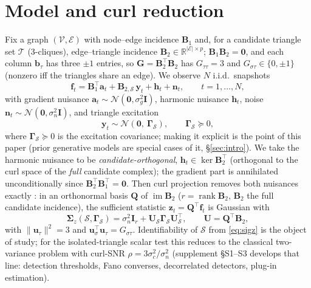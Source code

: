 \documentclass{article}
\DeclareMathOperator{\rank}{rank}
\DeclareMathOperator{\im}{im}
\newcommand{\B}{\bm{B}}
\newcommand{\R}{\mathbb{R}}
\newcommand{\Scal}{\mathcal{S}}
\newcommand{\Tcal}{\mathcal{T}}
\newcommand{\Gam}{\bm{\Gamma}}
\begin{document}
\section{Model and curl reduction}
Fix a graph $(\mathcal V,\mathcal E)$ with node--edge incidence $\B_1$ and,
for a candidate triangle set $\Tcal$ (3-cliques), edge--triangle incidence
$\B_2\in\R^{|\mathcal E|\times p}$; $\B_1\B_2=\bm 0$, and each column
$\bm b_\tau$ has three $\pm1$ entries, so $\bm G=\B_2^{\!\top}\B_2$ has
$G_{\tau\tau}=3$ and $G_{\sigma\tau}\in\{0,\pm1\}$ (nonzero iff the triangles
share an edge). We observe $N$ i.i.d.\ snapshots
\begin{equation}\label{eq:model}
\bm f_t=\B_1^{\!\top}\bm a_t+\B_{2,\Scal}\,\bm y_t+\bm h_t+\bm n_t,\qquad
t=1,\dots,N,
\end{equation}
with gradient nuisance $\bm a_t\!\sim\!\mathcal N(\bm 0,\sigma_g^2\bm I)$,
harmonic nuisance $\bm h_t$, noise
$\bm n_t\!\sim\!\mathcal N(\bm 0,\sigma_n^2\bm I)$, and triangle excitation
\begin{equation}\label{eq:gamma}
\bm y_t\sim\mathcal N(\bm 0,\ \Gam_\Scal),\qquad \Gam_\Scal\succeq0 ,
\end{equation}
where $\Gam_\Scal\succeq0$ is the excitation covariance; making it explicit
is the point of this paper (prior generative models are special cases of it,
\S\ref{sec:intro}). We take the harmonic nuisance to be
\emph{candidate-orthogonal}, $\bm h_t\in\ker\B_2^{\!\top}$ (orthogonal to the
curl space of the \emph{full} candidate complex); the gradient part is
annihilated unconditionally since $\B_2^{\!\top}\B_1^{\!\top}=\bm0$. Then
curl projection removes both nuisances exactly
\cite{jiang2011statistical}: in an orthonormal basis $\bm Q$ of $\im\B_2$
($r=\rank\B_2$, $\B_2$ the full candidate incidence), the sufficient
statistic $\bm z_t=\bm Q^{\!\top}\bm f_t$ is Gaussian with
\begin{equation}\label{eq:sigz}
\bm\Sigma_z(\Scal,\Gam_\Scal)=\sigma_n^2\bm I_r
+\bm U_\Scal\Gam_\Scal\bm U_\Scal^{\!\top},\qquad
\bm U=\bm Q^{\!\top}\B_2 ,
\end{equation}
with $\|\bm u_\tau\|^2=3$ and $\bm u_\sigma^{\!\top}\bm u_\tau=G_{\sigma\tau}$.
Identifiability of $\Scal$ from \eqref{eq:sigz} is the object of study; for
the isolated-triangle scalar test this reduces to the classical two-variance
problem with curl-SNR $\rho=3\sigma_c^2/\sigma_n^2$
\cite{poor1994introduction} (supplement \S S1--S3 develops that line:
detection thresholds, Fano converses, decorrelated detectors, plug-in
estimation).
\end{document}
